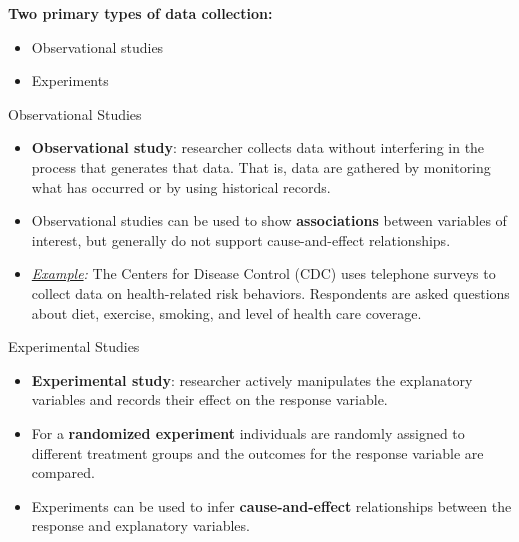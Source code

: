 \documentclass[10pt]{beamer}
\begin{document}
\begin{frame}
\large \textbf{Two primary types of data collection:}
\begin{itemize}
\item Observational studies
\item Experiments
\end{itemize}
\end{frame}

\begin{frame}{Observational Studies}
\begin{itemize}
\item \textbf{Observational study}: researcher collects data without interfering in the process that generates that data.  That is, data are gathered by monitoring what has occurred or by using historical records.
\vspace{5pt} 
\item Observational studies can be used to show \textbf{associations} between variables of interest, but generally do not support cause-and-effect relationships.
\vspace{5pt} 
\item \emph{\underline{Example}:} The Centers for Disease Control (CDC) uses telephone surveys to collect data on health-related risk behaviors. Respondents are asked questions about diet, exercise, smoking, and level of health care coverage.  
\end{itemize}
\end{frame}

\begin{frame}{Experimental Studies}
\begin{itemize}
\item \textbf{Experimental study}: researcher actively manipulates the explanatory variables and records their effect on the response variable.
\vspace{5pt}
\item For a \textbf{randomized experiment} individuals are randomly assigned to different treatment groups and the outcomes for the response variable are compared.
\vspace{5pt} 
\item Experiments can be used to infer \textbf{cause-and-effect} relationships between the response and explanatory variables.
\end{itemize}
\end{frame}
\end{document}
